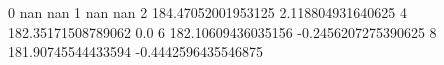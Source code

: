 0 nan nan
1 nan nan
2 184.47052001953125 2.118804931640625
4 182.35171508789062 0.0
6 182.10609436035156 -0.2456207275390625
8 181.90745544433594 -0.4442596435546875
